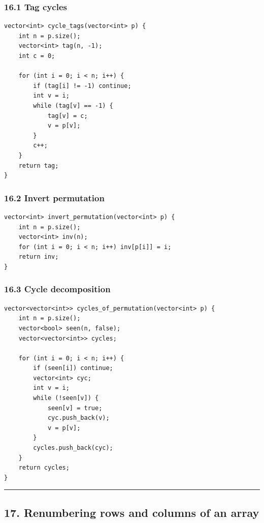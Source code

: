 \documentclass[11pt]{article}
\begin{document}
\subsubsection{16.1 Tag cycles}\label{tag-cycles}

\begin{verbatim}
vector<int> cycle_tags(vector<int> p) {
    int n = p.size();
    vector<int> tag(n, -1);
    int c = 0;

    for (int i = 0; i < n; i++) {
        if (tag[i] != -1) continue;
        int v = i;
        while (tag[v] == -1) {
            tag[v] = c;
            v = p[v];
        }
        c++;
    }
    return tag;
}
\end{verbatim}

\subsubsection{16.2 Invert permutation}\label{invert-permutation}

\begin{verbatim}
vector<int> invert_permutation(vector<int> p) {
    int n = p.size();
    vector<int> inv(n);
    for (int i = 0; i < n; i++) inv[p[i]] = i;
    return inv;
}
\end{verbatim}

\subsubsection{16.3 Cycle decomposition}\label{cycle-decomposition}

\begin{verbatim}
vector<vector<int>> cycles_of_permutation(vector<int> p) {
    int n = p.size();
    vector<bool> seen(n, false);
    vector<vector<int>> cycles;

    for (int i = 0; i < n; i++) {
        if (seen[i]) continue;
        vector<int> cyc;
        int v = i;
        while (!seen[v]) {
            seen[v] = true;
            cyc.push_back(v);
            v = p[v];
        }
        cycles.push_back(cyc);
    }
    return cycles;
}
\end{verbatim}

\begin{center}\rule{0.5\linewidth}{0.5pt}\end{center}

\subsection{17. Renumbering rows and columns of an array}\label{renumbering-rows-and-columns-of-an-array}
\end{document}
